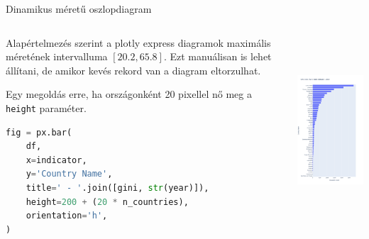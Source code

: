 \documentclass[english, aspectratio=169]{beamer}
\begin{document}
	\begin{frame}[fragile]{Dinamikus méretű oszlopdiagram}
		\begin{columns}
			\begin{column}{.5\textwidth}
				Alapértelmezés szerint a plotly express diagramok maximális méretének intervalluma $\left[20.2, 65.8\right]$. Ezt manuálisan is lehet állítani, de amikor kevés rekord van a diagram eltorzulhat.\par\smallskip
				Egy megoldás erre, ha országonként 20 pixellel nő meg a \texttt{height} paraméter.
				\begin{lstlisting}[language=python]
fig = px.bar(
	df,
	x=indicator,
	y='Country Name',
	title=' - '.join([gini, str(year)]),
	height=200 + (20 * n_countries),
	orientation='h',
)
				\end{lstlisting}
			\end{column}
			\begin{column}{.5\textwidth}
				\begin{center}
					\includegraphics[width=7cm, height=7cm, keepaspectratio]{images/plots_16.png}
				\end{center}
			\end{column}
		\end{columns}
	\end{frame}
	
\end{document}
